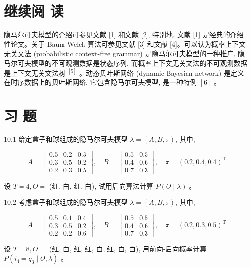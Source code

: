 \documentclass[10pt]{article}
\begin{document}
\begin{CJK*}{UTF8}{bsmi}
\begin{enumerate}
\end{enumerate}

\section*{继续阅 读}
隐马尔可夫模型的介绍可参见文献 [1] 和文献 [2], 特别地, 文献 [1] 是经典的介绍性论文。关于 Baum-Welch 算法可参见文献 [3] 和文献 [4]。可以认为概率上下文无关文法 (probabilistic context-free grammar) 是隐马尔可夫模型的一种推广, 隐马尔可夫模型的不可观测数据是状态序列, 而概率上下文无关文法的不可观测数据是上下文无关文法树 ${ }^{[5]}$ 。动态贝叶斯网络 (dynamic Bayesian network) 是定义在时序数据上的贝叶斯网络, 它包含隐马尔可夫模型, 是一种特例 $[6]$ 。

\section*{习 题}
10.1 给定盒子和球组成的隐马尔可夫模型 $\lambda=(A, B, \pi)$, 其中,

$$
A=\left[\begin{array}{lll}
0.5 & 0.2 & 0.3 \\
0.3 & 0.5 & 0.2 \\
0.2 & 0.3 & 0.5
\end{array}\right], \quad B=\left[\begin{array}{cc}
0.5 & 0.5 \\
0.4 & 0.6 \\
0.7 & 0.3
\end{array}\right], \quad \pi=(0.2,0.4,0.4)^{\mathrm{T}}
$$

设 $T=4, O=$ (红, 白, 红, 白), 试用后向算法计算 $P(O \mid \lambda)$ 。

10.2 考虑盒子和球组成的隐马尔可夫模型 $\lambda=(A, B, \pi)$, 其中,

$$
A=\left[\begin{array}{lll}
0.5 & 0.1 & 0.4 \\
0.3 & 0.5 & 0.2 \\
0.2 & 0.2 & 0.6
\end{array}\right], \quad B=\left[\begin{array}{ll}
0.5 & 0.5 \\
0.4 & 0.6 \\
0.7 & 0.3
\end{array}\right], \quad \pi=(0.2,0.3,0.5)^{\mathrm{T}}
$$

设 $T=8, O=$ (红, 白, 红, 红, 白, 红, 白, 白), 用前向-后向概率计算 $P\left(i_{4}=q_{3} \mid O, \lambda\right)$ 。


\end{CJK*}
\end{document}
